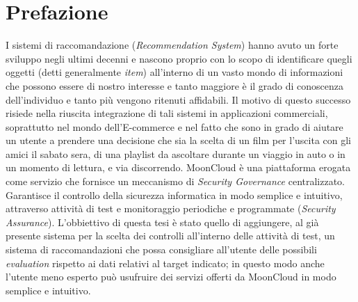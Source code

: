 \chapter{Prefazione}
I sistemi di raccomandazione (\textit{Recommendation System}) hanno avuto un forte sviluppo negli ultimi decenni e 
nascono proprio con lo scopo di identificare quegli oggetti (detti generalmente \textit{item}) all'interno di un vasto 
mondo di informazioni che possono essere di nostro interesse e tanto maggiore è il grado di conoscenza dell'individuo 
e tanto più vengono ritenuti affidabili.
\newline
Il motivo di questo successo risiede nella riuscita integrazione di tali sistemi in applicazioni commerciali, 
soprattutto nel mondo dell’E-commerce e nel fatto che sono in grado di aiutare un utente a prendere una decisione 
che sia la scelta di un film per l'uscita con gli amici il sabato sera, di una playlist da ascoltare durante 
un viaggio in auto o in un momento di lettura, e via discorrendo. 
\newline
MoonCloud è una piattaforma erogata come servizio che fornisce un meccanismo di \textit{Security Governance} centralizzato. 
Garantisce il controllo della sicurezza informatica in modo semplice e intuitivo, attraverso attività di test e monitoraggio 
periodiche e programmate (\textit{Security Assurance}). L'obbiettivo di questa tesi è stato quello di aggiungere, al già 
presente sistema per la scelta dei controlli all'interno delle attività di test, un sistema di raccomandazioni che possa 
consigliare all'utente delle possibili \textit{evaluation} rispetto ai dati relativi al target indicato; in questo modo 
anche l'utente meno esperto può usufruire dei servizi offerti da MoonCloud in modo semplice e intuitivo.  


